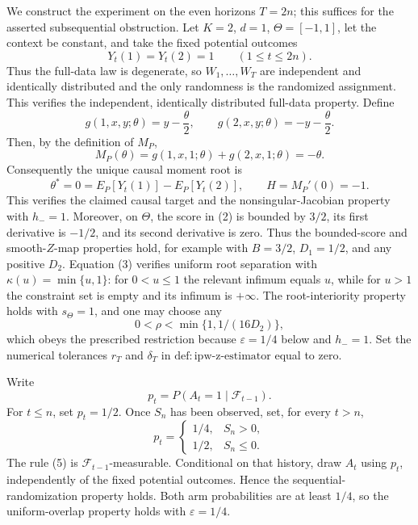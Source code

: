 We construct the experiment on the even horizons \(T=2n\); this suffices for the asserted subsequential obstruction. Let \(K=2\), \(d=1\), \(\Theta=[-1,1]\), let the context be constant, and take the fixed potential outcomes
\[
 Y_t(1)=Y_t(2)=1\qquad(1\le t\le 2n).
\tag{1}
\]
Thus the full-data law is degenerate, so \(W_1,\ldots,W_T\) are independent and identically distributed and the only randomness is the randomized assignment. This verifies the independent, identically distributed full-data property. Define
\[
 g(1,x,y;\theta)=y-\frac{\theta}{2},
 \qquad
 g(2,x,y;\theta)=-y-\frac{\theta}{2}.
\tag{2}
\]
Then, by the definition of \(M_P\),
\[
 M_P(\theta)=g(1,x,1;\theta)+g(2,x,1;\theta)=-\theta.
\tag{3}
\]
Consequently the unique causal moment root is
\[
 \theta^*=0=E_P[Y_t(1)]-E_P[Y_t(2)],
 \qquad H=M_P'(0)=-1.
\tag{4}
\]
This verifies the claimed causal target and the nonsingular-Jacobian property with \(h_-=1\). Moreover, on \(\Theta\), the score in (2) is bounded by \(3/2\), its first derivative is \(-1/2\), and its second derivative is zero. Thus the bounded-score and smooth-\(Z\)-map properties hold, for example with \(B=3/2\), \(D_1=1/2\), and any positive \(D_2\). Equation (3) verifies uniform root separation with \(\kappa(u)=\min\{u,1\}\): for \(0<u\le1\) the relevant infimum equals \(u\), while for \(u>1\) the constraint set is empty and its infimum is \(+\infty\). The root-interiority property holds with \(s_\Theta=1\), and one may choose any
\[
 0<\rho<\min\{1,1/(16D_2)\},
\]
which obeys the prescribed restriction because \(\varepsilon=1/4\) below and \(h_-=1\). Set the numerical tolerances \(r_T\) and \(\delta_T\) in \(\mathrm{def:ipw\text{-}z\text{-}estimator}\) equal to zero.

Write
\[
 p_t=P(A_t=1\mid\mathcal F_{t-1}).
\]
For \(t\le n\), set \(p_t=1/2\). Once \(S_n\) has been observed, set, for every \(t>n\),
\[
 p_t=
 \begin{cases}
 1/4,&S_n>0,\\
 1/2,&S_n\le0.
 \end{cases}
\tag{5}
\]
The rule (5) is \(\mathcal F_{t-1}\)-measurable. Conditional on that history, draw \(A_t\) using \(p_t\), independently of the fixed potential outcomes. Hence the sequential-randomization property holds. Both arm probabilities are at least \(1/4\), so the uniform-overlap property holds with \(\varepsilon=1/4\).

